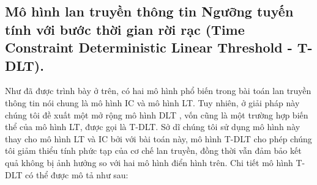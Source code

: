  	\subsection{Mô hình lan truyền thông tin Ngưỡng tuyến tính với bước thời gian rời rạc (Time Constraint Deterministic Linear Threshold - T-DLT).}
 	Như đã được trình bày ở trên, có hai mô hình phổ biến trong bài toán lan truyền thông tin nói chung là mô hình IC và mô hình LT. Tuy nhiên, ở giải pháp này chúng tôi đề xuất một mở rộng mô hình DLT \cite{zaixin}, vốn cũng là một trường hợp biến thể của mô hình LT, được gọi là T-DLT. Sở dĩ chúng tôi sử dụng mô hình này thay cho mô hình LT và IC bởi với bài toán này, mô hình T-DLT cho phép chúng tôi giảm thiểu tính phức tạp của cơ chế lan truyền, đồng thời vẫn đảm bảo kết quả không bị ảnh hưởng so với hai mô hình điển hình trên. Chi tiết mô hình T-DLT có thể được mô tả như sau:

